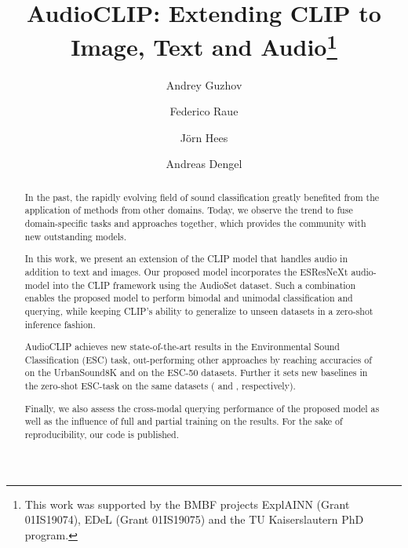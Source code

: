 \documentclass[runningheads]{llncs}
\newif\ifreview
\begin{document}
\def\SubNumber{000}

\def\GCPRTrack{Regular Track}


\ifreview
\title{AudioCLIP: Extending CLIP to Image, Text and Audio}
\else
\title{AudioCLIP: Extending CLIP to Image, Text and Audio\thanks{This work was supported by the BMBF projects ExplAINN (Grant 01IS19074), EDeL (Grant 01IS19075) and the TU Kaiserslautern PhD program.}}
\fi


\ifreview
\titlerunning{DAGM GCPR 2021 Submission \SubNumber{}. CONFIDENTIAL REVIEW COPY.}
	\authorrunning{DAGM GCPR 2021 Submission \SubNumber{}. CONFIDENTIAL REVIEW COPY.}
	\author{DAGM GCPR 2021 - \GCPRTrack{}}
	\institute{Paper ID \SubNumber}
\else


	\author{
	    Andrey Guzhov  \and
	    Federico Raue  \and
	    J\"orn Hees  \and
	    Andreas Dengel  }
	


\fi

\maketitle              

\begin{abstract}
In the past, the rapidly evolving field of sound classification greatly benefited from the application of methods from other domains.
Today, we observe the trend to fuse domain-specific tasks and approaches together, which provides the community with new outstanding models.

In this work, we present an extension of the \mbox{CLIP} model that handles audio in addition to text and images.
Our proposed model incorporates the \mbox{ESResNeXt} audio-model into the \mbox{CLIP} framework using the \mbox{AudioSet} dataset.
Such a combination enables the proposed model to perform bimodal and unimodal classification and querying, while keeping \mbox{CLIP's} ability to generalize to unseen datasets in a zero-shot inference fashion.

AudioCLIP achieves new state-of-the-art results in the Environmental Sound Classification (ESC) task, out-performing other approaches by reaching accuracies of  on the \mbox{UrbanSound8K} and  on the \mbox{ESC-50} datasets.
Further it sets new baselines in the zero-shot ESC-task on the same datasets ( and , respectively).

Finally, we also assess the cross-modal querying performance of the proposed model as well as the influence of full and partial training on the results.
For the sake of reproducibility, our code is published.

\end{abstract}
\end{document}
